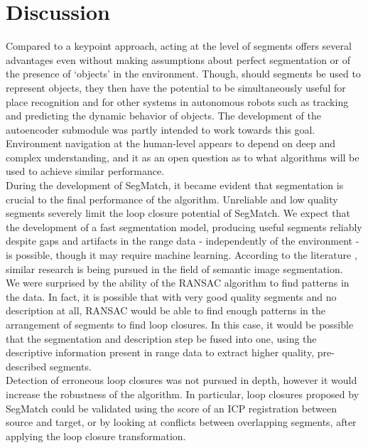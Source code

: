 \chapter{Discussion}
\label{chap:discussion}

Compared to a keypoint approach, acting at the level of segments offers several advantages even without making assumptions about perfect segmentation or of the presence of `objects' in the environment. Though, should segments be used to represent objects, they then have the potential to be simultaneously useful for place recognition and for other systems in autonomous robots such as tracking and predicting the dynamic behavior of objects. The development of the autoencoder submodule was partly intended to work towards this goal. Environment navigation at the human-level appears to depend on deep and complex understanding, and it as an open question as to what algorithms will be used to achieve similar performance.\\

During the development of SegMatch, it became evident that segmentation is crucial to the final performance of the algorithm. Unreliable and low quality segments severely limit the loop closure potential of SegMatch. We expect that the development of a fast segmentation model, producing useful segments reliably despite gaps and artifacts in the range data - independently of the environment - is possible, though it may require machine learning. According to the literature \cite{semantic}, similar research is being pursued in the field of semantic image segmentation.\\

We were surprised by the ability of the RANSAC algorithm to find patterns in the data. In fact, it is possible that with very good quality segments and no description at all, RANSAC would be able to find enough patterns in the arrangement of segments to find loop closures. In this case, it would be possible that the segmentation and description step be fused into one, using the descriptive information present in range data to extract higher quality, pre-described segments.\\

Detection of erroneous loop closures was not pursued in depth, however it would increase the robustness of the algorithm. In particular, loop closures proposed by SegMatch could be validated using the score of an ICP registration between source and target, or by looking at conflicts between overlapping segments, after applying the loop closure transformation.\\

